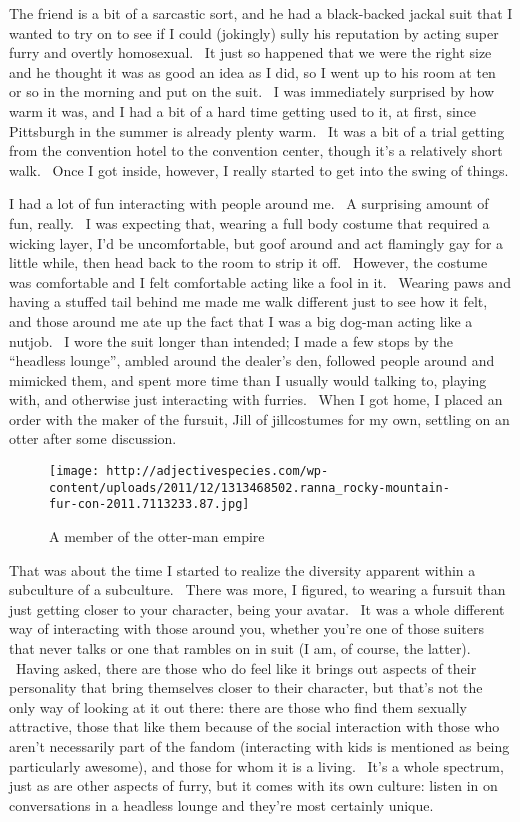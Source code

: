 The friend is a bit of a sarcastic sort, and he had a black-backed
jackal suit that I wanted to try on to see if I could (jokingly) sully
his reputation by acting super furry and overtly homosexual. ~It just so
happened that we were the right size and he thought it was as good an
idea as I did, so I went up to his room at ten or so in the morning and
put on the suit. ~I was immediately surprised by how warm it was, and I
had a bit of a hard time getting used to it, at first, since Pittsburgh
in the summer is already plenty warm. ~It was a bit of a trial getting
from the convention hotel to the convention center, though it's a
relatively short walk. ~Once I got inside, however, I really started to
get into the swing of things.

I had a lot of fun interacting with people around me. ~A surprising
amount of fun, really. ~I was expecting that, wearing a full body
costume that required a wicking layer, I'd be uncomfortable, but goof
around and act flamingly gay for a little while, then head back to the
room to strip it off. ~However, the costume was comfortable and I felt
comfortable acting like a fool in it. ~Wearing paws and having a stuffed
tail behind me made me walk different just to see how it felt, and those
around me ate up the fact that I was a big dog-man acting like a nutjob.
~I wore the suit longer than intended; I made a few stops by the
``headless lounge'', ambled around the dealer's den, followed people
around and mimicked them, and spent more time than I usually would
talking to, playing with, and otherwise just interacting with furries.
~When I got home, I placed an order with the maker of the fursuit, Jill
of jillcostumes for my own, settling on an otter after some discussion.

\begin{figure}[htbp]
\centering
\texttt{[image: http://adjectivespecies.com/wp-content/uploads/2011/12/1313468502.ranna\_rocky-mountain-fur-con-2011.7113233.87.jpg]}
\caption{A member of the otter-man empire}
\end{figure}

That was about the time I started to realize the diversity apparent
within a subculture of a subculture. ~There was more, I figured, to
wearing a fursuit than just getting closer to your character, being your
avatar. ~It was a whole different way of interacting with those around
you, whether you're one of those suiters that never talks or one that
rambles on in suit (I am, of course, the latter). ~Having asked, there
are those who do feel like it brings out aspects of their personality
that bring themselves closer to their character, but that's not the only
way of looking at it out there: there are those who find them sexually
attractive, those that like them because of the social interaction with
those who aren't necessarily part of the fandom (interacting with kids
is mentioned as being particularly awesome), and those for whom it is a
living. ~It's a whole spectrum, just as are other aspects of furry, but
it comes with its own culture: listen in on conversations in a headless
lounge and they're most certainly unique.

